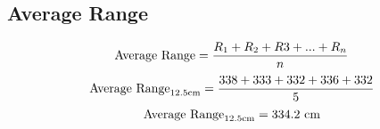 \subsection{Average Range}
\label{sampleCalc}
\begin{equation}
        \textup{Average Range} = \frac{R_{1} + R_{2} + R{3} + ... + R_{n}}{n}
\end{equation}
\begin{equation}
    \textup{Average Range}_{12.5\textup{cm}} = \frac{338 + 333 + 332 + 336 + 332}{5}
\end{equation}
\begin{equation}
    \textup{Average Range}_{12.5\textup{cm}} = 334.2 \textup{ cm}%
\end{equation}
